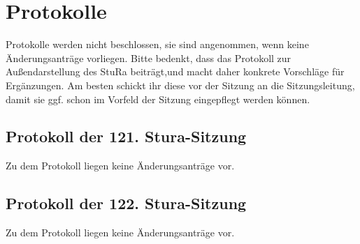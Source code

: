 \section{Protokolle}
Protokolle werden nicht beschlossen, sie sind angenommen, wenn keine Änderungsanträge vorliegen.
Bitte bedenkt, dass das Protokoll zur Außendarstellung des StuRa beiträgt,und macht daher konkrete Vorschläge
für Ergänzungen. Am besten schickt ihr diese vor der Sitzung an die Sitzungsleitung, damit sie ggf. schon im 
Vorfeld der Sitzung eingepflegt werden können.
\subsection{Protokoll der 121. Stura-Sitzung}
Zu dem Protokoll liegen keine Änderungsanträge vor. %
\subsection{Protokoll der 122. Stura-Sitzung}
Zu dem Protokoll liegen keine Änderungsanträge vor.